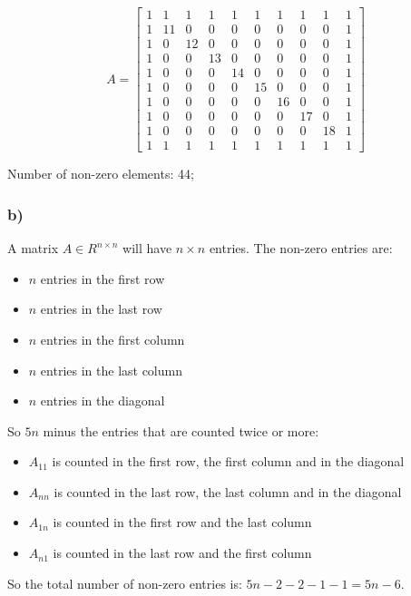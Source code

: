 \documentclass[unicode,11pt,a4paper,oneside,numbers=endperiod,openany]{scrartcl}
\begin{document}

\[A = 
\begin{bmatrix}
    1 & 1 & 1 & 1 & 1 & 1 & 1 & 1 & 1 & 1 \\
    1 & 11 & 0 & 0 & 0 & 0 & 0 & 0 & 0 & 1 \\
    1 & 0 & 12 & 0 & 0 & 0 & 0 & 0 & 0 & 1 \\
    1 & 0 & 0 & 13 & 0 & 0 & 0 & 0 & 0 & 1 \\
    1 & 0 & 0 & 0 & 14 & 0 & 0 & 0 & 0 & 1 \\
    1 & 0 & 0 & 0 & 0 & 15 & 0 & 0 & 0 & 1 \\
    1 & 0 & 0 & 0 & 0 & 0 & 16 & 0 & 0 & 1 \\
    1 & 0 & 0 & 0 & 0 & 0 & 0 & 17 & 0 & 1 \\
    1 & 0 & 0 & 0 & 0 & 0 & 0 & 0 & 18 & 1\\
    1 & 1 & 1 & 1 & 1 & 1 & 1 & 1 & 1 & 1
\end{bmatrix}
\]

Number of non-zero elements: 44;

\subsubsection*{b)}

A matrix $A \in R^{n \times n}$ will have $n \times n$ entries.
The non-zero entries are:
\begin{itemize}
    \item $n$ entries in the first row
    \item $n$ entries in the last row
    \item $n$ entries in the first column
    \item $n$ entries in the last column
    \item $n$ entries in the diagonal
\end{itemize}
So $5n$ minus the entries that are counted twice or more:
\begin{itemize}
    \item $A_{11}$ is counted in the first row, the first column and in the diagonal
    \item $A_{nn}$ is counted in the last row, the last column and in the diagonal
    \item $A_{1n}$ is counted in the first row and the last column
    \item $A_{n1}$ is counted in the last row and the first column
\end{itemize}
So the total number of non-zero entries is: $5n - 2 -2 -1-1 = 5n-6$.
\end{document}
